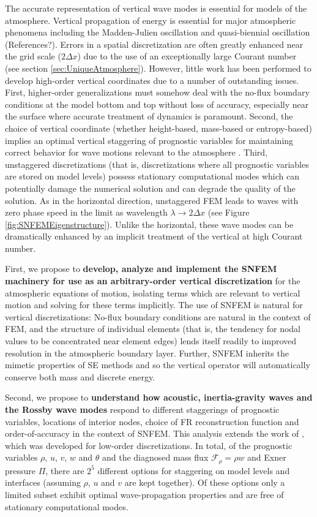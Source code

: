 \documentclass[11pt]{article}
\begin{document}
The accurate representation of vertical wave modes is essential for models of the atmosphere.  Vertical propagation of energy is essential for major atmospheric phenomena including the Madden-Julien oscillation and quasi-biennial oscillation {\color{red}(References?)}.  Errors in a spatial discretization are often greatly enhanced near the grid scale ($2 \Delta x$) due to the use of an exceptionally large Courant number (see section \ref{sec:UniqueAtmosphere}).  However, little work has been performed to develop high-order vertical coordinates due to a number of outstanding issues.  First, higher-order generalizations must somehow deal with the no-flux boundary conditions at the model bottom and top without loss of accuracy, especially near the surface where accurate treatment of dynamics is paramount.  Second, the choice of vertical coordinate (whether height-based, mass-based or entropy-based) implies an optimal vertical staggering of prognostic variables for maintaining correct behavior for wave motions relevant to the atmosphere \cite{thuburn2005vertical, JT2006QJRMS, MDTRDA2007JCP}.  Third, unstaggered discretizations (that is, discretizations where all prognostic variables are stored on model levels) possess stationary computational modes which can potentially damage the numerical solution and can degrade the quality of the solution.  As in the horizontal direction, unstaggered FEM leads to waves with zero phase speed in the limit as wavelength $\lambda \to 2 \Delta x$ (see Figure \ref{fig:SNFEMEigenstructure}).  Unlike the horizontal, these wave modes can be dramatically enhanced by an implicit treatment of the vertical at high Courant number.

First, we propose to \textbf{develop, analyze and implement the SNFEM machinery for use as an arbitrary-order vertical discretization} for the atmospheric equations of motion, isolating terms which are relevant to vertical motion and solving for these terms implicitly.  The use of SNFEM is natural for vertical discretizations:  No-flux boundary conditions are natural in the context of FEM, and the structure of individual elements (that is, the tendency for nodal values to be concentrated near element edges) lends itself readily to improved resolution in the atmospheric boundary layer.  Further, SNFEM inherits the mimetic properties of SE methods and so the vertical operator will automatically conserve both mass and discrete energy.

Second, we propose to \textbf{understand how acoustic, inertia-gravity waves and the Rossby wave modes} respond to different staggerings of prognostic variables, locations of interior nodes, choice of FR reconstruction function and order-of-accuracy in the context of SNFEM.  This analysis extends the work of \cite{thuburn2005vertical}, which was developed for low-order discretizations.  In total, of the prognostic variables $\rho$, $u$, $v$, $w$ and $\theta$ and the diagnosed mass flux $\mathcal{F}_\rho = \rho w$ and Exner pressure $\Pi$, there are $2^5$ different options for staggering on model levels and interfaces (assuming $\rho$, $u$ and $v$ are kept together).  Of these options only a limited subset exhibit optimal wave-propagation properties and are free of stationary computational modes.
\end{document}
